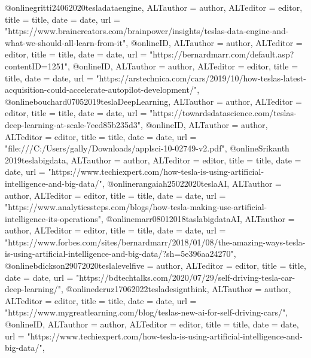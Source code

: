 {{{@online{gritti24062020tesladataengine,	ALTauthor = {author},	ALTeditor = {editor},	title = {title},	date = {date},	url = {"https://www.braincreators.com/brainpower/insights/teslas-data-engine-and-what-we-should-all-learn-from-it"},}
@online{ID,	ALTauthor = {author},	ALTeditor = {editor},	title = {title},	date = {date},	url = {"https://bernardmarr.com/default.asp?contentID=1251"},}
@online{ID,	ALTauthor = {author},	ALTeditor = {editor},	title = {title},	date = {date},	url = {"https://arstechnica.com/cars/2019/10/how-teslas-latest-acquisition-could-accelerate-autopilot-development/"},}
@online{bouchard07052019teslaDeepLearning,	ALTauthor = {author},	ALTeditor = {editor},	title = {title},	date = {date},	url = {"https://towardsdatascience.com/teslas-deep-learning-at-scale-7eed85b235d3"},}
@online{ID,	ALTauthor = {author},	ALTeditor = {editor},	title = {title},	date = {date},	url = {"file:///C:/Users/gally/Downloads/applsci-10-02749-v2.pdf"},}
@online{Srikanth
	2019teslabigdata,	ALTauthor = {author},	ALTeditor = {editor},	title = {title},	date = {date},	url = {"https://www.techiexpert.com/how-tesla-is-using-artificial-intelligence-and-big-data/"},}
@online{rangaiah25022020teslaAI,	ALTauthor = {author},	ALTeditor = {editor},	title = {title},	date = {date},	url = {"https://www.analyticssteps.com/blogs/how-tesla-making-use-artificial-intelligence-its-operations"},}
@online{marr08012018taslabigdataAI,	ALTauthor = {author},	ALTeditor = {editor},	title = {title},	date = {date},	url = {"https://www.forbes.com/sites/bernardmarr/2018/01/08/the-amazing-ways-tesla-is-using-artificial-intelligence-and-big-data/?sh=5e396aa24270"},}
@online{bdickson29072020teslalevelfive = {author},	ALTeditor = {editor},	title = {title},	date = {date},	url = {"https://bdtechtalks.com/2020/07/29/self-driving-tesla-car-deep-learning/"},}
@online{dcruz17062022tesladesignthink,	ALTauthor = {author},	ALTeditor = {editor},	title = {title},	date = {date},	url = {"https://www.mygreatlearning.com/blog/teslas-new-ai-for-self-driving-cars/"},}
@online{ID,	ALTauthor = {author},	ALTeditor = {editor},	title = {title},	date = {date},	url = {"https://www.techiexpert.com/how-tesla-is-using-artificial-intelligence-and-big-data/"},}





}}}
